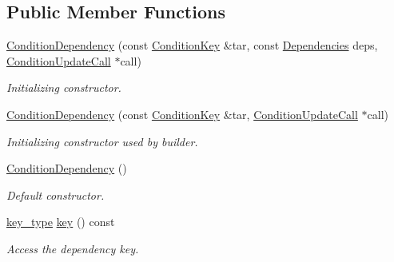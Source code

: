 \subsection*{Public Member Functions}
\begin{DoxyCompactItemize}
\item 
\hyperlink{class_d_d4hep_1_1_conditions_1_1_condition_dependency_aaf35fcc834e5ee49cc9d13fe9cff7ab5}{ConditionDependency} (const \hyperlink{class_d_d4hep_1_1_conditions_1_1_condition_key}{ConditionKey} \&tar, const \hyperlink{class_d_d4hep_1_1_conditions_1_1_condition_dependency_af1594501f40e514c5748092b94e4fd84}{Dependencies} deps, \hyperlink{class_d_d4hep_1_1_conditions_1_1_condition_update_call}{ConditionUpdateCall} $\ast$call)
\begin{DoxyCompactList}\small\item\em Initializing constructor. \item\end{DoxyCompactList}\item 
\hyperlink{class_d_d4hep_1_1_conditions_1_1_condition_dependency_aa3f6e8cb34ed2a24a07d6648668bf594}{ConditionDependency} (const \hyperlink{class_d_d4hep_1_1_conditions_1_1_condition_key}{ConditionKey} \&tar, \hyperlink{class_d_d4hep_1_1_conditions_1_1_condition_update_call}{ConditionUpdateCall} $\ast$call)
\begin{DoxyCompactList}\small\item\em Initializing constructor used by builder. \item\end{DoxyCompactList}\item 
\hyperlink{class_d_d4hep_1_1_conditions_1_1_condition_dependency_a9468a2ef21f829e7acf1569392ba2711}{ConditionDependency} ()
\begin{DoxyCompactList}\small\item\em Default constructor. \item\end{DoxyCompactList}\item 
\hyperlink{class_d_d4hep_1_1_conditions_1_1_condition_dependency_aeeb9606d1e1aae0a6eb4063ccfd1fca2}{key\_\-type} \hyperlink{class_d_d4hep_1_1_conditions_1_1_condition_dependency_a5eb216418c1f020fec66e221a38b9655}{key} () const 
\begin{DoxyCompactList}\small\item\em Access the dependency key. \item\end{DoxyCompactList}\item 

\end{DoxyCompactItemize}
